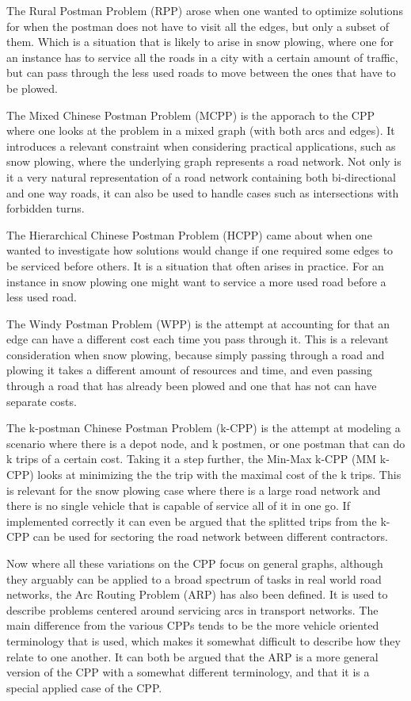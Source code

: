The Rural Postman Problem (RPP) arose when one wanted to optimize solutions for when the postman does not have to visit all the edges, but only a subset of them. Which is a situation that is likely to arise in snow plowing, where one for an instance has to service all the roads in a city with a certain amount of traffic, but can pass through the less used roads to move between the ones that have to be plowed.

The Mixed Chinese Postman Problem (MCPP) is the apporach to the CPP where one looks at the problem in a mixed graph (with both arcs and edges). It introduces a relevant constraint when considering practical applications, such as snow plowing, where the underlying graph represents a road network. Not only is it a very natural representation of a road network containing both bi-directional and one way roads, it can also be used to handle cases such as intersections with forbidden turns.

The Hierarchical Chinese Postman Problem (HCPP) came about when one wanted to investigate how solutions would change if one required some edges to be serviced before others. It is a situation that often arises in practice. For an instance in snow plowing one might want to service a more used road before a less used road.

The Windy Postman Problem (WPP) is the attempt at accounting for that an edge can have a different cost each time you pass through it. This is a relevant consideration when snow plowing, because simply passing through a road and plowing it takes a different amount of resources and time, and even passing through a road that has already been plowed and one that has not can have separate costs.

The k-postman Chinese Postman Problem (k-CPP) is the attempt at modeling a scenario where there is a depot node, and k postmen, or one postman that can do k trips of a certain cost. Taking it a step further, the Min-Max k-CPP (MM k-CPP) looks at minimizing the the trip with the maximal cost of the k trips. This is relevant for the snow plowing case where there is a large road network and there is no single vehicle that is capable of service all of it in one go. If implemented correctly it can even be argued that the splitted trips from the k-CPP can be used for sectoring the road network between different contractors.

Now where all these variations on the CPP focus on general graphs, although they arguably can be applied to a broad spectrum of tasks in real world road networks, the Arc Routing Problem (ARP) has also been defined. It is used to describe problems centered around servicing arcs in transport networks. The main difference from the various CPPs tends to be the more vehicle oriented terminology that is used, which makes it somewhat difficult to describe how they relate to one another. It can both be argued that the ARP is a more general version of the CPP with a somewhat different terminology, and that it is a special applied case of the CPP.

